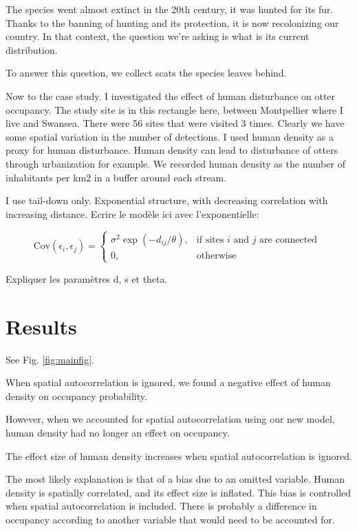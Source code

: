 \documentclass[
  11pt,
  a4paper,
]{article}
\begin{document}
The species went almost extinct in the 20th century, it was hunted for its fur. Thanks to the banning of hunting and its protection, it is now recolonizing our country. In that context, the question we're asking is what is its current distribution.

To answer this question, we collect scats the species leaves behind.

Now to the case study. I investigated the effect of human disturbance on otter occupancy.
The study site is in this rectangle here, between Montpellier where I live and Swansea.
There were 56 sites that were visited 3 times.
Clearly we have some spatial variation in the number of detections.
I used human density as a proxy for human disturbance.
Human density can lead to disturbance of otters through urbanization for example.
We recorded human density as the number of inhabitants per km2 in a buffer around each stream.

I use tail-down only. Exponential structure, with decreasing correlation with increasing distance. Ecrire le modèle ici avec l'exponentielle:

\[
    \text{Cov}(\epsilon_i,\epsilon_j)= 
\begin{cases}
    \displaystyle{\sigma^2\exp(-d_{ij}/\theta)},& \text{if sites } i \text{ and } j \text{ are connected }\\
    0,              & \text{otherwise}
\end{cases}
\]

Expliquer les paramètres d, s et theta.

\section{Results}\label{results}

See Fig. \ref{fig:mainfig}.

When spatial autocorrelation is ignored, we found a negative effect of human density on occupancy probability.

However, when we accounted for spatial autocorrelation using our new model, human density had no longer an effect on occupancy.

The effect size of human density increases when spatial autocorrelation is ignored.

The most likely explanation is that of a bias due to an omitted variable.
Human density is spatially correlated, and its effect size is inflated.
This bias is controlled when spatial autocorrelation is included.
There is probably a difference in occupancy according to another variable that would need to be accounted for.
\end{document}
